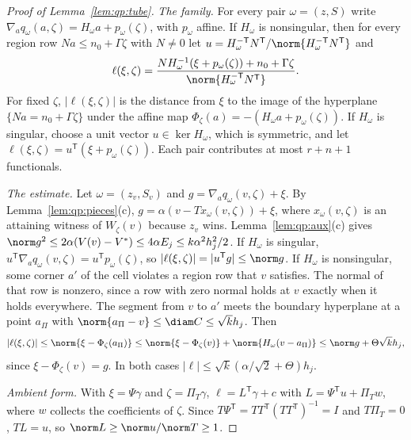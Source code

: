 \begin{proof}[Proof of Lemma~\ref{lem:qp:tube}]
\emph{The family.} For every pair $\omega=(z,S)$ write
$\nabla_aq_\omega(a,\zeta)=H_\omega a+p_\omega(\zeta)$, with $p_\omega$ affine.
If $H_\omega$ is nonsingular, then for every region row $N a\le n_0+\Gamma\zeta$
with $N\ne0$ let $u=H_\omega^{-\mathsf T}N^{\mathsf T}/\norm{H_\omega^{-\mathsf T}N^{\mathsf T}}$ and
\[
 \ell(\xi,\zeta)=\frac{N H_\omega^{-1}(\xi+p_\omega(\zeta))+n_0+\Gamma\zeta}{\norm{H_\omega^{-\mathsf T}N^{\mathsf T}}} .
\]
For fixed $\zeta$, $|\ell(\xi,\zeta)|$ is the distance from $\xi$ to the image
of the hyperplane $\{Na=n_0+\Gamma\zeta\}$ under the affine map
$\Phi_\zeta(a)=-(H_\omega a+p_\omega(\zeta))$. If $H_\omega$ is singular, choose a
unit vector $u\in\ker H_\omega$, which is symmetric, and let
$\ell(\xi,\zeta)=u^{\mathsf T}(\xi+p_\omega(\zeta))$. Each pair contributes at most
$r+n+1$ functionals.

\emph{The estimate.} Let $\omega=(z_v,S_v)$ and $g=\nabla_aq_\omega(v,\zeta)+\xi$.
By Lemma~\ref{lem:qp:pieces}(c), $g=\alpha(v-Tx_\omega(v,\zeta))+\xi$, where
$x_\omega(v,\zeta)$ is an attaining witness of $W_\zeta(v)$ because $z_v$ wins.
Lemma~\ref{lem:qp:aux}(c) gives
$\norm g^2\le2\alpha(V(v)-V^*)\le4\alpha E_j\le k\alpha^2h_j^2/2$. If $H_\omega$
is singular, $u^{\mathsf T}\nabla_aq_\omega(v,\zeta)=u^{\mathsf T} p_\omega(\zeta)$, so
$|\ell(\xi,\zeta)|=|u^{\mathsf T} g|\le\norm g$. If $H_\omega$ is nonsingular, some
corner $a'$ of the cell violates a region row that $v$ satisfies. The normal of
that row is nonzero, since a row with zero normal holds at $v$ exactly when it
holds everywhere. The segment from $v$ to $a'$ meets the boundary hyperplane
at a point $a_\Pi$ with $\norm{a_\Pi-v}\le\diam C\le\sqrt kh_j$. Then
\[
 |\ell(\xi,\zeta)|\le\norm{\xi-\Phi_\zeta(a_\Pi)}
 \le\norm{\xi-\Phi_\zeta(v)}+\norm{H_\omega(v-a_\Pi)}
 \le\norm g+\Theta\sqrt kh_j ,
\]
since $\xi-\Phi_\zeta(v)=g$. In both cases
$|\ell|\le\sqrt k(\alpha/\sqrt2+\Theta)h_j$.

\emph{Ambient form.} With $\xi=\Psi\gamma$ and $\zeta=\Pi_T\gamma$,
$\ell=L^{\mathsf T}\gamma+c$ with $L=\Psi^{\mathsf T} u+\Pi_Tw$, where $w$ collects the
coefficients of $\zeta$. Since $T\Psi^{\mathsf T}=TT^{\mathsf T}(TT^{\mathsf T})^{-1}=I$ and
$T\Pi_T=0$, $TL=u$, so $\norm L\ge\norm u/\norm T\ge1$.
\end{proof}

